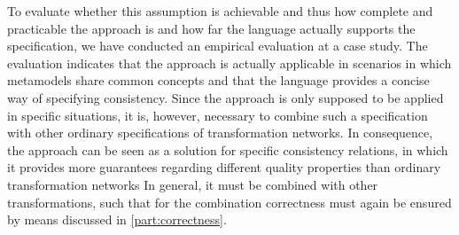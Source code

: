 To evaluate whether this assumption is achievable and thus how complete and practicable the approach is and how far the language actually supports the specification, we have conducted an empirical evaluation at a case study.
The evaluation indicates that the approach is actually applicable in scenarios in which metamodels share common concepts and that the language provides a concise way of specifying consistency.
Since the approach is only supposed to be applied in specific situations, it is, however, necessary to combine such a specification with other ordinary specifications of transformation networks.
In consequence, the \commonalities approach can be seen as a solution for specific consistency relations, in which it provides more guarantees regarding different quality properties than ordinary transformation networks
In general, it must be combined with other transformations, such that for the combination correctness must again be ensured by means discussed in \autoref{part:correctness}. 








